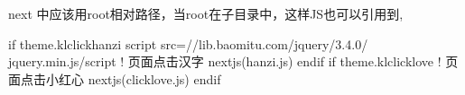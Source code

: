 \documentclass[letterpaper,12pt,english]{sphinxmanual}
\begin{document}
\begin{enumerate}
next 中应该用root相对路径，当root在子目录中，这样JS也可以引用到, 

\begin{sphinxVerbatim}[commandchars=\\\{\}]
\PYGZob{}\PYGZpc{}\PYGZhy{} if theme.kl\PYGZus{}click\PYGZus{}hanzi \PYGZpc{}\PYGZcb{}
      \PYGZlt{}script src=\PYGZdq{}//lib.baomitu.com/jquery/3.4.0/    jquery.min.js\PYGZdq{}\PYGZgt{}\PYGZlt{}/script\PYGZgt{}
      \PYGZlt{}!\PYGZhy{}\PYGZhy{} 页面点击汉字 \PYGZhy{}\PYGZhy{}\PYGZgt{}
      \PYGZob{}\PYGZob{}\PYGZhy{} next\PYGZus{}js(\PYGZsq{}hanzi.js\PYGZsq{}) \PYGZcb{}\PYGZcb{}
\PYGZob{}\PYGZpc{}\PYGZhy{} endif \PYGZpc{}\PYGZcb{}
\PYGZob{}\PYGZpc{}\PYGZhy{} if theme.kl\PYGZus{}click\PYGZus{}love \PYGZpc{}\PYGZcb{}
      \PYGZlt{}!\PYGZhy{}\PYGZhy{} 页面点击小红心 \PYGZhy{}\PYGZhy{}\PYGZgt{}
      \PYGZob{}\PYGZob{}\PYGZhy{} next\PYGZus{}js(\PYGZsq{}clicklove.js\PYGZsq{}) \PYGZcb{}\PYGZcb{}
\PYGZob{}\PYGZpc{}\PYGZhy{} endif \PYGZpc{}\PYGZcb{}
\end{sphinxVerbatim}

\end{enumerate}
\end{document}
